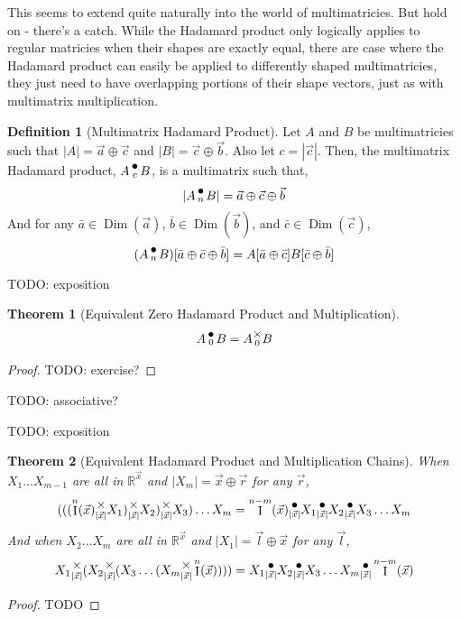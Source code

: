 \documentclass[12pt]{book}
\theoremstyle{plain}
\newtheorem{theorem}{Theorem}[chapter]
\theoremstyle{definition}
\newtheorem{definition}{Definition}[chapter]
\theoremstyle{ppart}
\theoremstyle{case}
\theoremstyle{solution}
\DeclareMathOperator{\Dim}{Dim}
\DeclareMathOperator{\Ident}{I}
\newcommand{\mmult}[1]{\text{\raisebox{1ex}{$\underset{#1}{\times}$}}}
\newcommand{\dmult}[1]{\text{\raisebox{1ex}{$\underset{#1}{\,\bullet\,}$}}}
\begin{document}
This seems to extend quite naturally into the world of multimatricies.
But hold on - there's a catch. While the Hadamard product only logically applies
to regular matricies when their shapes are exactly equal, there are case where
the Hadamard product can easily be applied to differently shaped multimatricies,
they just need to have overlapping portions of their shape vectors, just as
with multimatrix multiplication.

\begin{definition}[Multimatrix Hadamard Product]
\label{multi_had_prod}
Let $A$ and $B$ be multimatricies such that $|A| = \vec{a} \oplus \vec{c}$
and $|B| = \vec{c} \oplus \vec{b}$. Also let $c = |\vec{c}|$.
Then, the multimatrix Hadamard product, $A \dmult{c} B$, is a multimatrix
such that,
\[ |A \dmult{n} B| = \vec{a} \oplus \vec{c} \oplus \vec{b} \]
And for any $\bar{a} \in \Dim(\vec{a})$, $\bar{b} \in \Dim(\vec{b})$,
and $\bar{c} \in \Dim(\vec{c})$,
\[
  (A \dmult{n} B)[\bar{a} \oplus \bar{c} \oplus \bar{b}]
  = A[\bar{a} \oplus \bar{c}] B[\bar{c} \oplus \bar{b}]
\]
\end{definition}

TODO: exposition

\begin{theorem}[Equivalent Zero Hadamard Product and Multiplication]
\[ A \dmult{0} B = A \mmult{0} B \]
\end{theorem}
\begin{proof}
TODO: exercise?
\end{proof}

TODO: associative?

TODO: exposition

\begin{theorem}[Equivalent Hadamard Product and Multiplication Chains]
When $X_1 \ldots X_{m-1}$ are all in $\mathbb{R}^{\vec{x}}$ and
$|X_m| = \vec{x} \oplus \vec{r}$ for any $\vec{r}$,
\[
  (((\Ident^n(\vec{x})
  \mmult{|\vec{x}|} X_1) \mmult{|\vec{x}|} X_2) \mmult{|\vec{x}|} X_3)
  \ldots X_m
  =
  \Ident^{n-m}(\vec{x})
  \dmult{|\vec{x}|} X_1 \dmult{|\vec{x}|} X_2 \dmult{|\vec{x}|} X_3
  \ldots X_m
\]
And when $X_2 \ldots X_m$ are all in $\mathbb{R}^{\vec{x}}$ and
$|X_1| = \vec{l} \oplus \vec{x}$ for any $\vec{l}$,
\[
  X_1 \mmult{|\vec{x}|} (X_2 \mmult{|\vec{x}|} (X_3
  \ldots (X_m \mmult{|\vec{x}|} 
  \Ident^n(\vec{x}))))
  =
  X_1 \dmult{|\vec{x}|} X_2 \dmult{|\vec{x}|} X_3
  \ldots X_m \dmult{|\vec{x}|} 
  \Ident^{n-m}(\vec{x})
\]
\end{theorem}
\begin{proof}
TODO 
\end{proof}
\end{document}
